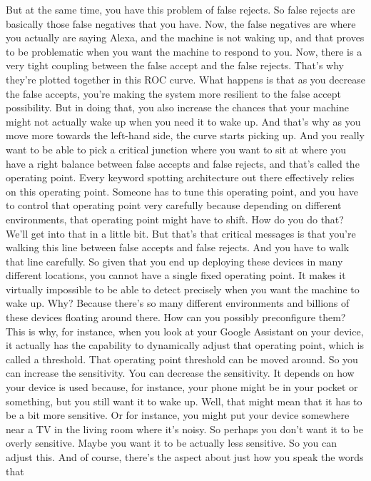 But at the same time, you have this problem of false rejects.
So false rejects are basically those false negatives that you have.
Now, the false negatives are where you actually are saying Alexa,
and the machine is not waking up, and that
proves to be problematic when you want the machine to respond to you.
Now, there is a very tight coupling between the false accept
and the false rejects.
That's why they're plotted together in this ROC curve.
What happens is that as you decrease the false accepts,
you're making the system more resilient to the false accept possibility.
But in doing that, you also increase the chances
that your machine might not actually wake up when you need it to wake up.
And that's why as you move more towards the left-hand side,
the curve starts picking up.
And you really want to be able to pick a critical junction where
you want to sit at where you have a right balance
between false accepts and false rejects, and that's called the operating point.
Every keyword spotting architecture out there effectively
relies on this operating point.
Someone has to tune this operating point,
and you have to control that operating point very carefully because depending
on different environments, that operating point might have to shift.
How do you do that?
We'll get into that in a little bit.
But that's that critical messages is that you're
walking this line between false accepts and false rejects.
And you have to walk that line carefully.
So given that you end up deploying these devices in many different locations,
you cannot have a single fixed operating point.
It makes it virtually impossible to be able to detect precisely when you
want the machine to wake up.
Why?
Because there's so many different environments and billions
of these devices floating around there.
How can you possibly preconfigure them?
This is why, for instance, when you look at your Google Assistant
on your device, it actually has the capability
to dynamically adjust that operating point, which is called a threshold.
That operating point threshold can be moved around.
So you can increase the sensitivity.
You can decrease the sensitivity.
It depends on how your device is used because, for instance, your phone might
be in your pocket or something, but you still want it to wake up.
Well, that might mean that it has to be a bit more sensitive.
Or for instance, you might put your device
somewhere near a TV in the living room where it's noisy.
So perhaps you don't want it to be overly sensitive.
Maybe you want it to be actually less sensitive.
So you can adjust this.
And of course, there's the aspect about just how you speak the words that
